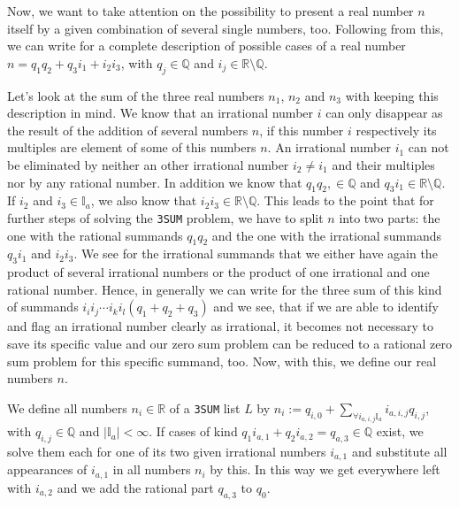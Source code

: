 Now, we want to take attention on the possibility to present a real number $n$ itself by a given combination of several single numbers, too. Following from this, we can write for a complete description of possible cases of a real number $n = q_{1}q_{2} + q_{3}i_{1} + i_{2}i_{3}$, with $q_{j} \in \mathbb{Q}$ and $i_{j} \in \mathbb{R} \setminus \mathbb{Q}$.

Let's look at the sum of the three real numbers $n_{1}$, $n_{2}$ and $n_{3}$ with keeping this description in mind. We know that an irrational number $i$ can only disappear as the result of the addition of several numbers $n$, if this number $i$ respectively its multiples are element of some of this numbers $n$. An irrational number $i_{1}$ can not be eliminated by neither an other irrational number $i_{2} \neq i_{1}$ and their multiples nor by any rational number. In addition we know that $q_{1}q_{2},  \in \mathbb{Q}$ and $q_{3}i_{1} \in \mathbb{R} \setminus \mathbb{Q}$. If $i_{2}$ and $i_{3} \in \mathbb{I}_{a}$, we also know that $i_{2}i_{3} \in \mathbb{R} \setminus \mathbb{Q}$. This leads to the point that for further steps of solving the \texttt{3SUM} problem, we have to split $n$ into two parts: the one with the rational summands $q_{1}q_{2}$ and the one with the irrational summands $q_{3}i_{1}$ and $i_{2}i_{3}$. We see for the irrational summands that we either have again the product of several irrational numbers or the product of one irrational and one rational number. Hence, in generally we can write for the three sum of this kind of summands $i_{i}i_{j} \cdots i_{k}i_{l}\left(q_{1} + q_{2} + q_{3}\right)$ and we see, that if we are able to identify and flag an irrational number clearly as irrational, it becomes not necessary to save its specific value and our zero sum problem can be reduced to a rational zero sum problem for this specific summand, too. Now, with this, we define our real numbers $n$.

\begin{definition}
    We define all numbers $n_{i} \in \mathbb{R}$ of a \texttt{3SUM} list $L$ by $n_{i} := q_{i,0} + \sum_{ \forall i_{a,i,j} \mathbb{I}_{a}} i_{a,i,j}q_{i,j}$, with $q_{i,j} \in \mathbb{Q}$ and $|\mathbb{I}_{a}| < \infty$. If cases of kind $q_{1} i_{a,1} + q_{2} i_{a,2} = q_{a,3} \in \mathbb{Q}$ exist, we solve them each for one of its two given irrational numbers $i_{a,1}$ and substitute all appearances of $i_{a,1}$ in all numbers $n_{i}$ by this. In this way we get everywhere left with $i_{a,2}$ and we add the rational part $q_{a,3}$ to $q_{0}$.
\label{def:realnumbersnof3sumL}
\end{definition}

